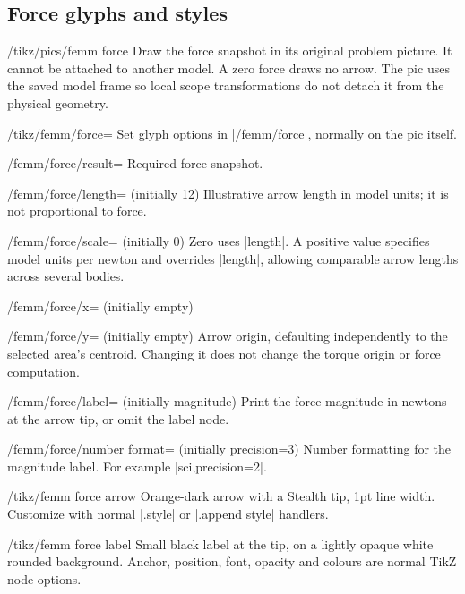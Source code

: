 \subsection{Force glyphs and styles}
\begin{key}{/tikz/pics/femm force}
Draw the force snapshot in its original problem picture. It cannot be attached
to another model. A zero force draws no arrow. The pic uses the saved model frame
so local scope transformations do not detach it from the physical geometry.
\end{key}
\begin{key}{/tikz/femm/force=}
Set glyph options in |/femm/force|, normally on the pic itself.
\end{key}
\begin{key}{/femm/force/result=}
Required force snapshot.
\end{key}
\begin{key}{/femm/force/length= (initially 12)}
Illustrative arrow length in model units; it is not proportional to force.
\end{key}
\begin{key}{/femm/force/scale= (initially 0)}
Zero uses |length|. A positive value specifies model units per newton and
overrides |length|, allowing comparable arrow lengths across several bodies.
\end{key}
\begin{key}{/femm/force/x= (initially empty)}
\end{key}
\begin{key}{/femm/force/y= (initially empty)}
Arrow origin, defaulting independently to the selected area's centroid.
Changing it does not change the torque origin or force computation.
\end{key}
\begin{key}{/femm/force/label= (initially magnitude)}
Print the force magnitude in newtons at the arrow tip, or omit the label node.
\end{key}
\begin{key}{/femm/force/number format= (initially precision=3)}
Number formatting for the magnitude label. For example |{sci,precision=2}|.
\end{key}
\begin{stylekey}{/tikz/femm force arrow}
Orange-dark arrow with a Stealth tip, 1pt line width. Customize with normal
|.style| or |.append style| handlers.
\end{stylekey}
\begin{stylekey}{/tikz/femm force label}
Small black label at the tip, on a lightly opaque white rounded background.
Anchor, position, font, opacity and colours are normal TikZ node options.
\end{stylekey}

